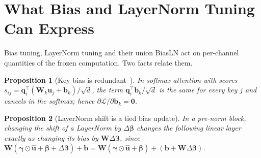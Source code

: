 \documentclass[fonts]{icst}
\newtheorem{proposition}{Proposition}
\begin{document}
\begin{table}[!t]
\centering
\caption{Measured cost on an NVIDIA A100-40GB (fp32, $224\times224$). Train: batch 32, forward + backward + Adam step. Infer: batch 1. Ckpt: size of the stored trainable tensors.}
\label{tab:cost}
\end{table}

\section{What Bias and LayerNorm Tuning Can Express}
\label{sec:analysis}

Bias tuning, LayerNorm tuning and their union BiasLN act on per-channel quantities of the frozen computation. Two facts relate them.

\begin{proposition}[Key bias is redundant~\cite{namazifar2023bias}]
\label{prop:key}
In softmax attention with scores $s_{ij}=\mathbf{q}_i^\top(\mathbf{W}_k\mathbf{u}_j+\mathbf{b}_k)/\sqrt{d}$, the term $\mathbf{q}_i^\top\mathbf{b}_k/\sqrt{d}$ is the same for every key $j$ and cancels in the softmax; hence $\partial\mathcal{L}/\partial\mathbf{b}_k=\mathbf{0}$.
\end{proposition}

\begin{proposition}[LayerNorm shift is a tied bias update]
\label{prop:fold}
In a pre-norm block, changing the shift of a LayerNorm by $\Delta\boldsymbol{\beta}$ changes the following linear layer exactly as changing its bias by $\mathbf{W}\Delta\boldsymbol{\beta}$, since $\mathbf{W}(\boldsymbol{\gamma}\odot\hat{\mathbf{u}}+\boldsymbol{\beta}+\Delta\boldsymbol{\beta})+\mathbf{b}=\mathbf{W}(\boldsymbol{\gamma}\odot\hat{\mathbf{u}}+\boldsymbol{\beta})+(\mathbf{b}+\mathbf{W}\Delta\boldsymbol{\beta})$.
\end{proposition}
\end{document}
